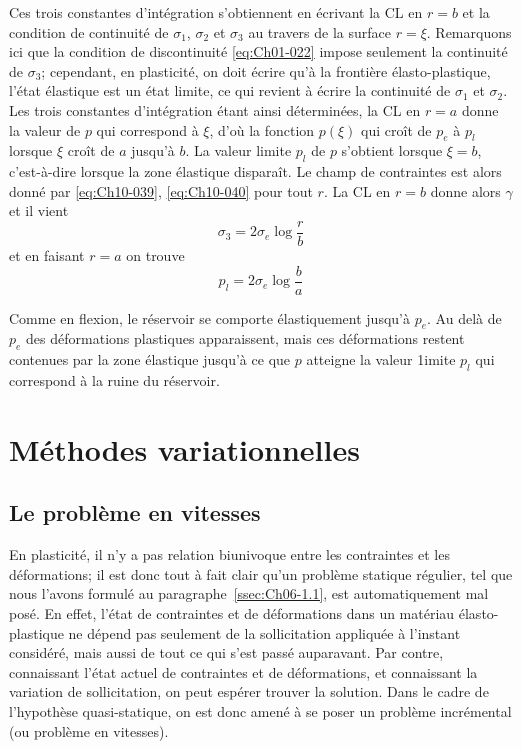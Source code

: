 Ces trois constantes d'intégration s'obtiennent en écrivant la CL en $r=b$ et la condition de continuité de $\sigma_1$, $\sigma_2$ et $\sigma_3$ au travers de la surface $r=\xi$.
Remarquons ici que la condition de discontinuité \eqref{eq:Ch01-022} impose seulement la continuité de $\sigma_3$; cependant, en plasticité, on doit écrire qu'à la frontière élasto-plastique, l'état élastique est un état limite, ce qui revient à écrire la continuité de $\sigma_1$ et $\sigma_2$.
Les trois constantes d'intégration étant ainsi déterminées, la CL en $r = a$ donne la valeur de $p$ qui correspond à $\xi$, d'où la fonction $p(\xi)$ qui croît de $p_e$ à $p_l$ lorsque $\xi$ croît de $a$ jusqu'à $b$.
La valeur limite $p_l$ de $p$ s'obtient lorsque $\xi=b$, c'est-à-dire lorsque la zone élastique disparaît.
Le champ de contraintes est alors donné par \eqref{eq:Ch10-039}, \eqref{eq:Ch10-040} pour tout $r$.
La CL en $r=b$ donne alors $\gamma$ et il vient 
\begin{equation}
    \sigma_3 = 2 \sigma_e \log \frac{r}{b}
    \label{eq:Ch10-041}
\end{equation}
et en faisant $r=a$ on trouve 
\begin{equation}
    p_l = 2 \sigma_e \log \frac{b}{a}
    \label{eq:Ch10-042}
\end{equation}

Comme en flexion, le réservoir se comporte élastiquement jusqu'à $p_e$.
Au delà de $p_e$ des déformations plastiques apparaissent, mais ces déformations restent contenues par la zone élastique jusqu'à ce que $p$ atteigne la valeur 1imite $p_l$ qui correspond à la ruine du réservoir. 

\section{Méthodes variationnelles} \label{sec:Ch10-3}
\subsection{Le problème en vitesses} \label{ssec:Ch10-3.1}
En plasticité, il n'y a pas relation biunivoque entre les contraintes et les déformations; il est donc tout à fait clair qu'un problème statique régulier, tel que nous l'avons formulé au paragraphe~\ref{ssec:Ch06-1.1}, est automatiquement mal posé. 
En effet, l'état de contraintes et de déformations dans un matériau élasto-plastique ne dépend pas seulement de la sollicitation appliquée à l'instant considéré, mais aussi de tout ce qui s'est passé auparavant.
Par contre, connaissant l'état actuel de contraintes et de déformations, et connaissant la variation de sollicitation, on peut espérer trouver la solution.
Dans le cadre de l'hypothèse quasi-statique, on est donc amené à se poser un problème incrémental (ou problème en vitesses). 

